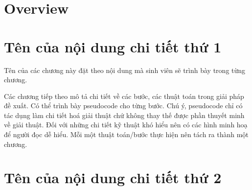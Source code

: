 \documentclass[../main.tex]{subfiles}
\begin{document}
\section{Overview}



\section{Tên của nội dung chi tiết thứ 1}
Tên của các chương này đặt theo nội dung mà sinh viên sẽ trình bày trong từng chương. 

Các chương tiếp theo mô tả chi tiết về các bước, các thuật toán trong giải pháp đề xuất. Có thể trình bày pseudocode cho từng bước. Chú ý, pseudocode chỉ có tác dụng làm chi tiết hoá giải thuật chứ không thay thế được phần thuyết minh về giải thuật. Đối với những chi tiết kỹ thuật khó hiểu nên có các hình minh hoạ để người đọc dễ hiểu. Mỗi một thuật toán/bước thực hiện nên tách ra thành một chương. 

\section{Tên của nội dung chi tiết thứ 2}
\end{document}
